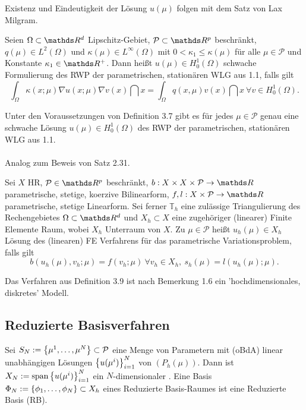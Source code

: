 Existenz und Eindeutigkeit der Lösung $u(\mu)$ folgen mit dem Satz von Lax Milgram.

Seien $\Omega\subset\R^d$ Lipschitz-Gebiet, $\mathcal{P}\subset \R^p$ beschränkt, $q(\mu)\in L^2(\Omega)$ und $\kappa(\mu)\in L^\infty(\Omega)$ mit $0<\kappa_1\le \kappa(\mu)$ für alle $\mu\in\mathcal{P}$ und Konstante $\kappa_1\in \R^+$.
Dann heißt $u(\mu)\in H_0^{1}(\Omega)$ schwache Formulierung des RWP der parametrischen, stationären WLG aus 1.1, falls gilt
\[
\int_{\Omega} \kappa(x;\mu)\nabla u(x;\mu) \nabla v(x)\dint x = \int_{\Omega} q(x,\mu)v(x)\dint x~\forall v\in H_0^1(\Omega).
\]

Unter den Voraussetzungen von Definition 3.7 gibt es für jedes $\mu\in\mathcal{P}$ genau eine schwache Lösung $u(\mu)\in H_0^1(\Omega)$ des RWP der parametrischen, stationären WLG aus 1.1.\\

\\
Analog zum Beweis von Satz 2.31.

Sei $X$ HR, $\mathcal{P}\in \R^p$ beschränkt, $b:X\times X\times \mathcal{P}\to \R$ parametrische, stetige, koerzive Bilinearform, $f,l:X\times \mathcal{P}\to \R$ parametrische, stetige Linearform.
Sei ferner $\mathbb{T}_h$ eine zulässige Triangulierung des Rechengebietes $\Omega\subset \R^d$ und $X_h\subset X$ eine zugehöriger (linearer) Finite Elemente Raum, wobei $X_h$ Unterraum von $X$.
Zu $\mu\in\mathcal{P}$ heißt $u_h(\mu)\in X_h$ Lösung des (linearen) FE Verfahrens für das parametrische Variationsproblem, falls gilt
\[
b(u_h(\mu),v_h;\mu) = f(v_h;\mu) ~\forall v_h\in X_h,~ s_h(\mu)= l(u_h(\mu);\mu).
\]

Das Verfahren aus Definition 3.9 ist nach Bemerkung 1.6 ein 'hochdimensionales, diskretes' Modell.

\subsection{Reduzierte Basisverfahren}

Sei $S_N := \left\{\mu^1, \dots ,\mu^N\right\}\subset \mathcal{P}$ eine Menge von Parametern mit (oBdA) linear unabhängigen Lösungen $\left\{u(\mu^i)\right\}_{i=1}^N$ von $(P_h(\mu))$.
Dann ist $X_N := \operatorname{span}\left\{u(\mu^i)\right\}_{i=1}^N$ ein $N$-dimensionaler .
Eine Basis $\Phi_N :=\left\{\phi_1, \dots ,\phi_N\right\}\subset X_h$ eines Reduzierte Basis-Raumes ist eine Reduzierte Basis (RB).

